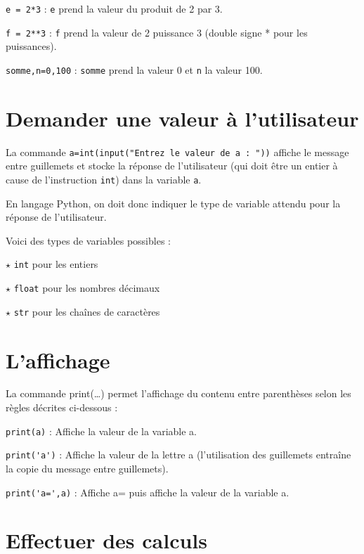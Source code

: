 \verb!e = 2*3! : \verb!e! prend la valeur du produit de 2 par 3.

\verb!f = 2**3! : \verb!f! prend la valeur de 2 puissance 3 (double signe * pour les puissances).

\verb!somme,n=0,100! : \verb!somme! prend la valeur 0 et \verb!n! la valeur 100.

\section{Demander une valeur à l'utilisateur}

La commande
\verb!a=int(input("Entrez le valeur de a : "))!
affiche le message entre guillemets et stocke la réponse de l'utilisateur (qui doit être un entier à cause de l'instruction \verb!int!) dans la variable \verb!a!.

En langage Python, on doit donc indiquer le type de variable attendu pour la réponse de l'utilisateur.

Voici des types de variables possibles :

$\star$ \verb!int! pour les entiers

$\star$ \verb!float! pour les nombres décimaux

$\star$ \verb!str! pour les chaînes de caractères


\section{L'affichage}

La commande \og print(\dots)\fg{} permet l'affichage du contenu entre parenthèses selon les règles décrites
ci-dessous :

\verb!print(a)! : Affiche la valeur de la variable a.

\verb!print('a')! :
Affiche la valeur de la lettre a (l'utilisation des guillemets
entraîne la copie du message entre guillemets).

\verb!print('a=',a)! : Affiche a= puis affiche la valeur de la variable a.

\section{Effectuer des calculs}


